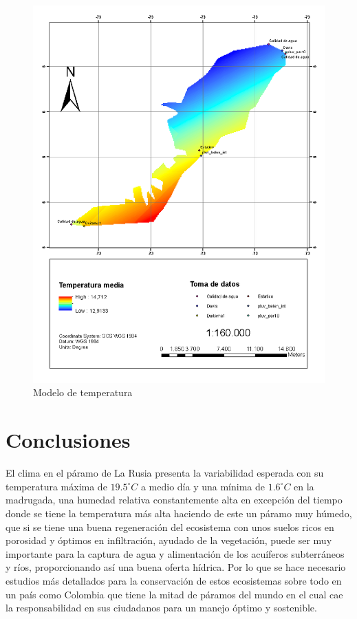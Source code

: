 \documentclass[conference,final,]{IEEEtran}
\makeatletter
\def\maxwidth{\ifdim\Gin@nat@width>\linewidth\linewidth
\else\Gin@nat@width\fi}
\let\Oldincludegraphics\includegraphics
\renewcommand{\includegraphics}[1]{\Oldincludegraphics[width=\maxwidth]{#1}}
\makeatother
\begin{document}
\begin{figure}
\centering
\includegraphics{paramo3.png}
\caption{Modelo de temperatura}
\end{figure}

\hypertarget{conclusiones}{%
\section{Conclusiones}\label{conclusiones}}

El clima en el páramo de La Rusia presenta la variabilidad esperada con
su temperatura máxima de \(19.5^{\circ}C\) a medio día y una mínima de
\(1.6^{\circ}C\) en la madrugada, una humedad relativa constantemente
alta en excepción del tiempo donde se tiene la temperatura más alta
haciendo de este un páramo muy húmedo, que si se tiene una buena
regeneración del ecosistema con unos suelos ricos en porosidad y óptimos
en infiltración, ayudado de la vegetación, puede ser muy importante para
la captura de agua y alimentación de los acuíferos subterráneos y ríos,
proporcionando así una buena oferta hídrica. Por lo que se hace
necesario estudios más detallados para la conservación de estos
ecosistemas sobre todo en un país como Colombia que tiene la mitad de
páramos del mundo en el cual cae la responsabilidad en sus ciudadanos
para un manejo óptimo y sostenible.


\end{document}
